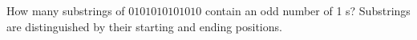 How many substrings of $0101010101010$ contain an odd number of 1 s? Substrings are distinguished by their starting and ending positions.
